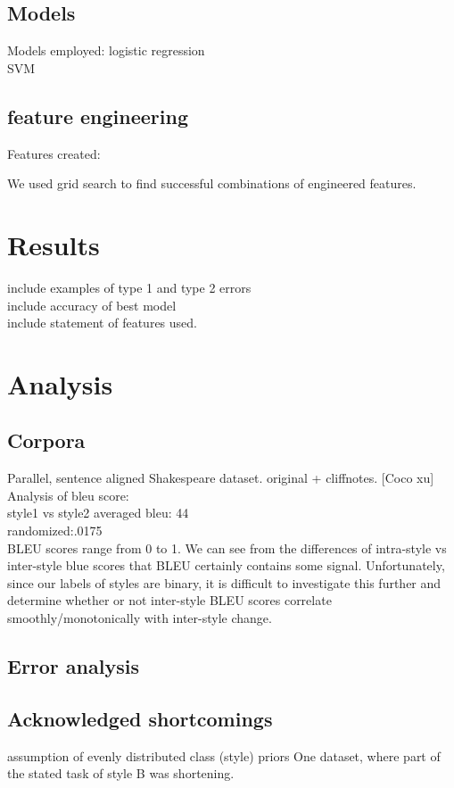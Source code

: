 \documentclass[letterpaper, 10 pt, conference]{ieeeconf}  %
\begin{document}
\subsection{Models}
Models employed:
logistic regression\\
SVM




\subsection{feature engineering}
Features created:


We used grid search to find successful combinations of engineered features.
  
\section{Results}
  include examples of type 1 and type 2 errors\\
  include accuracy of best model\\
  include statement of features used.\\
\section{Analysis}
  \subsection{Corpora}
    Parallel, sentence aligned Shakespeare dataset. original + cliffnotes. [Coco xu]
    Analysis of bleu score:\\

    style1 vs style2 averaged bleu: 44 \\
randomized:.0175 \\

  BLEU scores range from 0 to 1. We can see from the differences of intra-style vs inter-style blue scores that BLEU certainly contains some signal. Unfortunately, since our labels of styles are binary, it is difficult to investigate this further and determine whether or not inter-style BLEU scores correlate smoothly/monotonically with inter-style change.

  \subsection{Error analysis}
  \subsection{Acknowledged shortcomings}
  assumption of evenly distributed class (style) priors
One dataset, where part of the stated task of style B was shortening.
\end{document}

